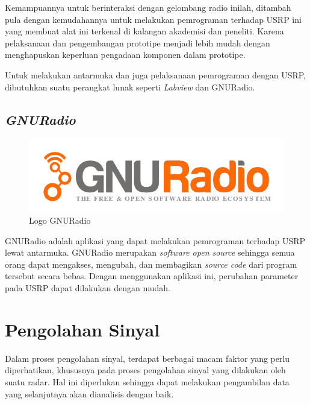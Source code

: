 Kemampuannya untuk berinteraksi dengan gelombang radio inilah, ditambah pula dengan kemudahannya untuk melakukan pemrograman terhadap USRP ini yang membuat alat ini terkenal di kalangan akademisi dan peneliti. Karena pelaksanaan dan pengembangan prototipe menjadi lebih mudah dengan menghapuskan keperluan pengadaan komponen dalam prototipe.

Untuk melakukan antarmuka dan juga pelaksanaan pemrograman dengan USRP, dibutuhkan suatu perangkat lunak seperti \textit{Labview} dan GNURadio.

\subsection{\textit{GNURadio}}

\begin{figure}
	\begin{center}
		\includegraphics[scale=0.5]{pics/bab2/GNU.png} 
		\caption[Logo GNURadio]{Logo GNURadio}
		\label{pic:logoGnuRadio}
	\end{center}
\end{figure}
GNURadio adalah aplikasi yang dapat melakukan pemrograman terhadap USRP lewat antarmuka. GNURadio merupakan \textit{software open source} sehingga semua orang dapat mengakses, mengubah, dan membagikan \textit{source code} dari program tersebut secara bebas. Dengan menggunakan aplikasi ini, perubahan parameter pada USRP dapat dilakukan dengan mudah.

\section{Pengolahan Sinyal}

Dalam proses pengolahan sinyal, terdapat berbagai macam faktor yang perlu diperhatikan, khususnya pada proses pengolahan sinyal yang dilakukan oleh suatu radar. Hal ini diperlukan sehingga dapat melakukan pengambilan data yang selanjutnya akan dianalisis dengan baik. 

